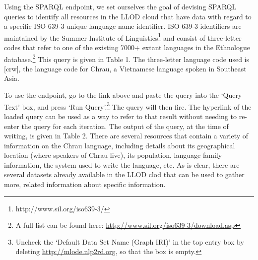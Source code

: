 Using the SPARQL endpoint, we set ourselves the goal of devising SPARQL queries to identify all resources in the LLOD cloud that have data with regard to a specific ISO 639-3 unique language name identifier. ISO 639-3 identifiers are maintained by the Summer Institute of Linguistics\footnote{http://www.sil.org/iso639-3/} and consist of three-letter codes that refer to one of the existing 7000+ extant languages in the Ethnologue  database.\footnote{A full list can be found here: \url{http://www.sil.org/iso639-3/download.asp}} This query is given in Table 1. The three-letter language code used is [crw], the language code for Chrau, a Vietnamese language spoken in Southeast Asia. 

To use the endpoint, go to the link above and paste the query into the `Query Text' box, and press `Run Query'.\footnote{Uncheck the `Default Data Set Name (Graph IRI)' in the top entry box by deleting \url{http://mlode.nlp2rd.org}, so that the box is empty.} The query will then fire. The hyperlink of the loaded query can be used as a way to refer to that result without needing to re-enter the query for each iteration. The output of the query, at the time of writing, is given in Table 2. There are several resources that contain a variety of information on the Chrau language, including details about its geographical location (where speakers of Chrau live), its population, language family information, the system used to write the language, etc. As is clear, there are several datasets already available in the LLOD clod that can be used to gather more, related information about specific information.


